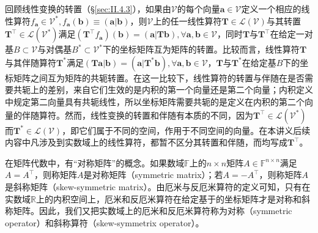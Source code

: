 \documentclass[main.tex]{subfiles}
\begin{document}
回顾线性变换的转置（\S\ref{sec:II.4.3}），如果由$\mathcal{V}$的每个向量$\mathbf{a}\in\mathcal{V}$定义一个相应的线性算符$f_\mathbf{a}\in\mathcal{V}^*,f_\mathbf{a}\left(\mathbf{b}\right)\equiv\left(\mathbf{a}|\mathbf{b}\right)$，则$\mathcal{V}$上的任一线性算符$\mathbf{T}\in\mathcal{L}\left(\mathcal{V}\right)$与其转置$\mathbf{T}^\intercal\in\mathcal{L}\left(\mathcal{V}^*\right)$满足$\left(\mathbf{T}^\intercal f_\mathbf{a}\right)\left(\mathbf{b}\right)=\left(\mathbf{a}|\mathbf{Tb}\right),\forall\mathbf{a},\mathbf{b}\in\mathcal{V}$，同时$\mathbf{T}$与$\mathbf{T}^\intercal$在给定一对基$B\subset\mathcal{V}$与对偶基$B^*\subset\mathcal{V}^*$下的坐标矩阵互为矩阵的转置。比较而言，线性算符$\mathbf{T}$与其伴随算符$\mathbf{T}^*$满足$\left(\mathbf{Ta}|\mathbf{b}\right)=\left(\mathbf{a}|\mathbf{T}^*\mathbf{b}\right),\forall\mathbf{a},\mathbf{b}\in\mathcal{V}$，$\mathbf{T}$与$\mathbf{T}^*$在给定基$B$下的坐标矩阵之间互为矩阵的共轭转置。在这一比较下，线性算符的转置与伴随在是否需要共轭上的差别，来自它们生效的是内积的第一个向量还是第二个向量；内积定义中规定第二向量具有共轭线性，所以坐标矩阵需要共轭的是定义在内积的第二个向量的伴随算符。然而，线性变换的转置和伴随有本质的不同，因为$\mathbf{T}^\intercal\in\mathcal{L}\left(\mathcal{V}^*\right)$而$\mathbf{T}^*\in\mathcal{L}\left(\mathcal{V}\right)$，即它们属于不同的空间，作用于不同空间的向量。在本讲义后续内容中凡涉及到实数域上的线性算符，都暂不区分其转置和伴随，而均写成$\mathbf{T}^\intercal$。

在矩阵代数中，有“对称矩阵”的概念。如果数域$\mathbb{F}$上的$n\times n$矩阵$A\in\mathbb{F}^{n\times n}$满足$A=A^\intercal$，则称矩阵$A$是对称矩阵（symmetric matrix）；若$A=-A^\intercal$，则称矩阵$A$是斜称矩阵（skew-symmetric matrix）。由厄米与反厄米算符的定义可知，只有在实数域$\mathbb{R}$上的内积空间上，厄米和反厄米算符在给定基于的坐标矩阵才是对称和斜称矩阵。因此，我们又把实数域上的厄米和反厄米算符称为对称（symmetric operator）和斜称算符（skew-symmetrix operator）。
\end{document}
